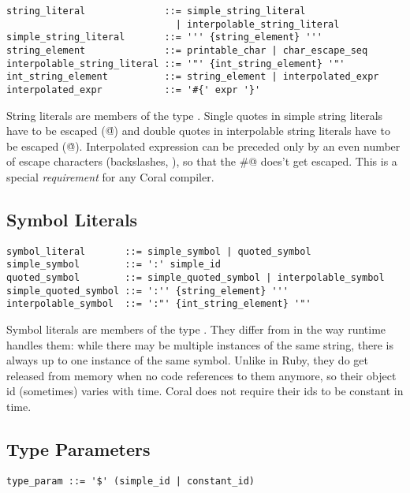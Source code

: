 \syntax\begin{lstlisting}
string_literal              ::= simple_string_literal 
                              | interpolable_string_literal
simple_string_literal       ::= ''' {string_element} '''
string_element              ::= printable_char | char_escape_seq
interpolable_string_literal ::= '"' {int_string_element} '"'
int_string_element          ::= string_element | interpolated_expr
interpolated_expr           ::= '#{' expr '}'
\end{lstlisting}

String literals are members of the type \lstinline@String@. Single quotes in simple string literals have to be escaped (\lstinline@\'@) and double quotes in interpolable string literals have to be escaped (\lstinline@\"@). Interpolated expression can be preceded only by an even number of escape characters (backslashes, \lstinline@\@), so that the \lstinline@#@ does't get escaped. This is a special \textit{requirement} for any Coral compiler. 

\subsection{Symbol Literals}\label{sec:symbolliterals}

\syntax\begin{lstlisting}
symbol_literal       ::= simple_symbol | quoted_symbol
simple_symbol        ::= ':' simple_id
quoted_symbol        ::= simple_quoted_symbol | interpolable_symbol
simple_quoted_symbol ::= ':'' {string_element} '''
interpolable_symbol  ::= ':"' {int_string_element} '"'
\end{lstlisting}

Symbol literals are members of the type \lstinline@Symbol@. They differ from  in the way runtime handles them: while there may be multiple instances of the same string, there is always up to one instance of the same symbol. Unlike in Ruby, they do get released from memory when no code references to them anymore, so their object id (sometimes) varies with time. Coral does not require their ids to be constant in time. 

\subsection{Type Parameters}\label{sec:typeparameterliterals}

\syntax\begin{lstlisting}[mathescape=false]
type_param ::= '$' (simple_id | constant_id)
\end{lstlisting}

